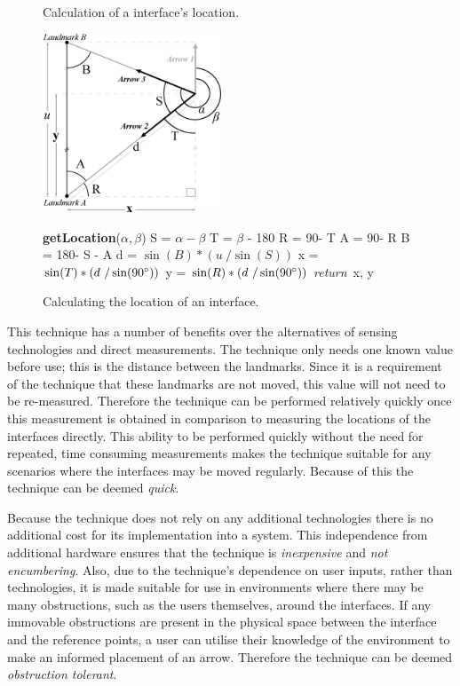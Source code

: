 \documentclass{bmcart}
\newenvironment{Algorithm}[1]{\begin{minipage}{0.45\textwidth}\centering\begin{minipage}{#1}\begin{algorithm}[H]}{\end{algorithm}\end{minipage}\end{minipage}}
\newcommand{\INDSTATE}[1][1]{\STATE\hspace{#1\algorithmicindent}}
\begin{document}
\begin{figure}[h]
   \centering
   \caption{Calculation of a interface's location.}
   \includegraphics[width=0.475\textwidth]{figures/trig-illustration.png}
   \label{fig:trig}

\begin{Algorithm}{6cm}
\caption{Calculating the location of an interface.}
\label{algo:location}
\begin{algorithmic}
\STATE \textbf{getLocation}(${\alpha}, {\beta}$)
\INDSTATE[2] S = $\alpha - \beta$
\INDSTATE[2] T = $\beta$ - 180\degree
\INDSTATE[2] R = 90\degree - T
\INDSTATE[2] A = 90\degree - R
\INDSTATE[2] B = 180\degree - S - A
\INDSTATE[2] d = $\sin (B) * (u\ / \sin (S))$
\INDSTATE[2] x = $\sin (T) * (d\ / \sin (90\degree))$
\INDSTATE[2] y = $\sin (R) * (d\ / \sin (90\degree))$
\STATE \textit{return}\ x, y
\end{algorithmic}
\end{Algorithm}
\end{figure}

This technique has a number of benefits over the alternatives of sensing technologies and direct measurements.
The technique only needs one known value before use; this is the distance between the landmarks.
Since it is a requirement of the technique that these landmarks are not moved, this value will not need to be re-measured.
Therefore the technique can be performed relatively quickly once this measurement is obtained in comparison to measuring the locations of the interfaces directly.
This ability to be performed quickly without the need for repeated, time consuming measurements makes the technique suitable for any scenarios where the interfaces may be moved regularly.
Because of this the technique can be deemed \textit{quick}.

Because the technique does not rely on any additional technologies there is no additional cost for its implementation into a system.
This independence from additional hardware ensures that the technique is \textit{inexpensive} and \textit{not encumbering}.
Also, due to the technique's dependence on user inputs, rather than technologies, it is made suitable for use in environments where there may be many obstructions, such as the users themselves, around the interfaces.
If any immovable obstructions are present in the physical space between the interface and the reference points, a user can utilise their knowledge of the environment to make an informed placement of an arrow.
Therefore the technique can be deemed \textit{obstruction tolerant}.
\end{document}
